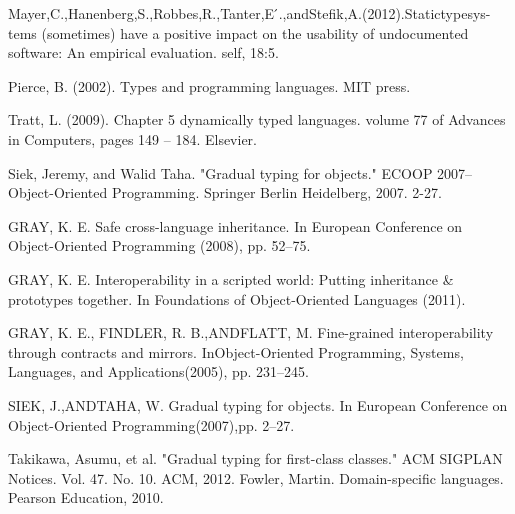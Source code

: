 \documentclass[preprint]{sigplanconf}
\begin{document}
\begin{thebibliography}{}
Mayer,C.,Hanenberg,S.,Robbes,R.,Tanter,E ́.,andStefik,A.(2012).Statictypesys- tems (sometimes) have a positive impact on the usability of undocumented software: An empirical evaluation. self, 18:5.

Pierce, B. (2002). Types and programming languages. MIT press.

Tratt, L. (2009). Chapter 5 dynamically typed languages. volume 77 of Advances in Computers, pages 149 – 184. Elsevier.

Siek, Jeremy, and Walid Taha. "Gradual typing for objects." ECOOP 2007–Object-Oriented Programming. Springer Berlin Heidelberg, 2007. 2-27.

GRAY, K. E. Safe cross-language inheritance. In European Conference on Object-Oriented Programming (2008), pp. 52–75.

GRAY, K. E. Interoperability in a scripted world: Putting inheritance \& prototypes together. In Foundations of Object-Oriented Languages (2011).

GRAY, K. E., FINDLER, R. B.,ANDFLATT, M. Fine-grained interoperability through contracts and mirrors. InObject-Oriented Programming, Systems, Languages, and Applications(2005), pp. 231–245.

SIEK, J.,ANDTAHA, W. Gradual typing for objects. In European Conference on Object-Oriented Programming(2007),pp. 2–27.

Takikawa, Asumu, et al. "Gradual typing for first-class classes." ACM SIGPLAN Notices. Vol. 47. No. 10. ACM, 2012.
Fowler, Martin. Domain-specific languages. Pearson Education, 2010.

\end{thebibliography}
\end{document}
